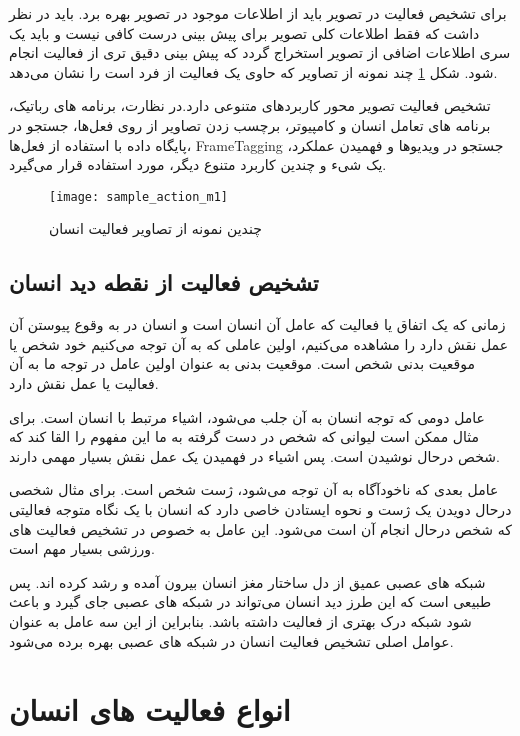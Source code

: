 برای تشخیص فعالیت در تصویر باید از اطلاعات موجود در تصویر بهره برد. باید در نظر داشت که فقط اطلاعات کلی تصویر برای پیش بینی درست کافی نیست و باید یک سری اطلاعات اضافی از تصویر استخراج گردد که پیش بینی دقیق تری از فعالیت انجام شود.
شکل
\ref{fig:humanActionM1}
چند نمونه از تصاویر که حاوی یک فعالیت از فرد است را نشان می‌دهد.

تشخیص فعالیت تصویر محور کاربردهای متنوعی دارد.در نظارت، برنامه های رباتیک،‌ برنامه های تعامل انسان و کامپیوتر، برچسب زدن تصاویر از روی فعل‌ها، جستجو در پایگاه داده با استفاده از فعل‌ها، %
\gls{FrameTagging}
،جستجو در ویدیوها و فهمیدن عملکرد یک شیء و چندین کاربرد متنوع دیگر، مورد استفاده قرار می‌گیرد.
\cite{UnderstandingActionRecogAll}

\begin{figure}[ht]
	\centerline{\texttt{[image: sample\_action\_m1]}}
	\caption{چندین نمونه از تصاویر فعالیت انسان
		\cite{tasvirAvalChapterYek}
	}
	\label{fig:humanActionM1}
\end{figure}
\subsection{تشخیص فعالیت از نقطه دید انسان}
زمانی که یک اتفاق یا فعالیت که عامل آن انسان است و انسان در به وقوع پیوستن آن عمل نقش دارد را مشاهده می‌کنیم، اولین عاملی که به آن توجه می‌کنیم خود شخص یا موقعیت بدنی شخص است. موقعیت بدنی به عنوان اولین عامل در توجه ما به آن فعالیت یا عمل نقش دارد.

عامل دومی که توجه انسان به آن جلب می‌شود، اشیاء مرتبط با انسان است. برای مثال ممکن است لیوانی که شخص در دست گرفته به ما این مفهوم را القا کند که شخص درحال نوشیدن است. پس اشیاء در فهمیدن یک عمل نقش بسیار مهمی دارند.

عامل بعدی که ناخودآگاه به آن توجه می‌شود، ژست شخص است. برای مثال شخصی درحال دویدن یک ژست و نحوه ایستادن خاصی دارد که انسان با یک نگاه متوجه فعالیتی که شخص درحال انجام آن است می‌شود. این عامل به خصوص در تشخیص فعالیت های ورزشی بسیار مهم است.

شبکه های عصبی عمیق از دل ساختار مغز انسان بیرون آمده و رشد کرده اند. پس طبیعی است که این طرز دید انسان می‌تواند در شبکه های عصبی جای گیرد و باعث شود شبکه درک بهتری از فعالیت داشته باشد. بنابراین از این سه عامل به عنوان عوامل اصلی تشخیص فعالیت انسان در شبکه های عصبی بهره برده می‌شود.

\section{انواع فعالیت های انسان}

